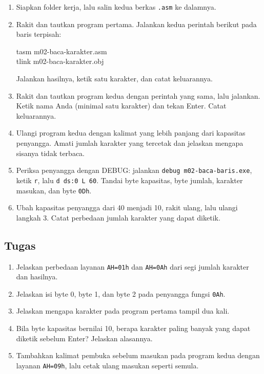 \begin{enumerate}
    \item Siapkan folder kerja, lalu salin kedua berkas \texttt{.asm}
          ke dalamnya.
    \item Rakit dan tautkan program pertama. Jalankan kedua perintah
          berikut pada baris terpisah:
          \begin{perintah}
tasm m02-baca-karakter.asm\\
tlink m02-baca-karakter.obj
\end{perintah}
          Jalankan hasilnya, ketik satu karakter, dan catat keluarannya.
    \item Rakit dan tautkan program kedua dengan perintah yang sama,
          lalu jalankan. Ketik nama Anda (minimal satu karakter) dan
          tekan Enter. Catat keluarannya.
    \item Ulangi program kedua dengan kalimat yang lebih panjang dari
          kapasitas penyangga. Amati jumlah karakter yang tercetak
          dan jelaskan mengapa sisanya tidak terbaca.
    \item Periksa penyangga dengan DEBUG: jalankan
          \texttt{debug m02-baca-baris.exe}, ketik \texttt{r}, lalu
          \texttt{d ds:0 L 60}. Tandai byte kapasitas, byte jumlah,
          karakter masukan, dan byte \texttt{0Dh}.
    \item Ubah kapasitas penyangga dari 40 menjadi 10, rakit ulang,
          lalu ulangi langkah 3. Catat perbedaan jumlah karakter yang
          dapat diketik.
\end{enumerate}

\subsection{Tugas}

\begin{enumerate}
    \item Jelaskan perbedaan layanan \texttt{AH=01h} dan
          \texttt{AH=0Ah} dari segi jumlah karakter dan hasilnya.
    \item Jelaskan isi byte 0, byte 1, dan byte 2 pada penyangga
          fungsi \texttt{0Ah}.
    \item Jelaskan mengapa karakter pada program pertama tampil dua
          kali.
    \item Bila byte kapasitas bernilai 10, berapa karakter paling
          banyak yang dapat diketik sebelum Enter? Jelaskan alasannya.
    \item Tambahkan kalimat pembuka sebelum masukan pada program
          kedua dengan layanan \texttt{AH=09h}, lalu cetak ulang
          masukan seperti semula.
\end{enumerate}


